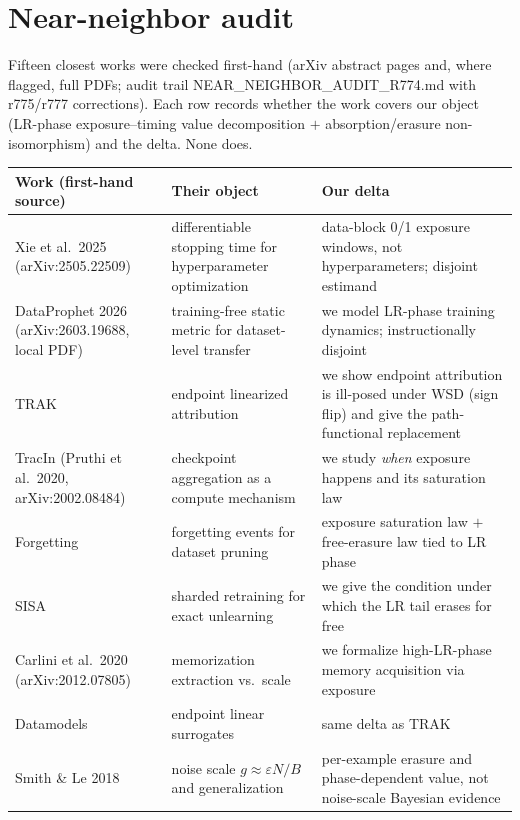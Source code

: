 \documentclass{article}
\begin{document}
\appendix
\section{Near-neighbor audit}
\label{app:neighbors}
Fifteen closest works were checked first-hand (arXiv abstract pages and, where flagged, full
PDFs; audit trail NEAR\_NEIGHBOR\_AUDIT\_R774.md with r775/r777 corrections). Each row records
whether the work covers our object (LR-phase exposure--timing value decomposition $+$
absorption/erasure non-isomorphism) and the delta. None does.

\begin{center}
\small
\begin{tabular}{@{}p{}p{}p{}@{}}
\toprule
Work (first-hand source) & Their object & Our delta \\
\midrule
Xie et al.\ 2025 (arXiv:2505.22509) & differentiable stopping time for hyperparameter
optimization & data-block 0/1 exposure windows, not hyperparameters; disjoint estimand \\
DataProphet 2026 (arXiv:2603.19688, local PDF) & training-free static metric for
dataset-level transfer & we model LR-phase training dynamics; instructionally disjoint \\
TRAK \citep{park2023trak} & endpoint linearized attribution & we show endpoint attribution is
ill-posed under WSD (sign flip) and give the path-functional replacement \\
TracIn (Pruthi et al.\ 2020, arXiv:2002.08484) & checkpoint aggregation as a compute
mechanism & we study \emph{when} exposure happens and its saturation law \\
Forgetting \citep{toneva2019forgetting} & forgetting events for dataset pruning & exposure
saturation law $+$ free-erasure law tied to LR phase \\
SISA \citep{bourtoule2021sisa} & sharded retraining for exact unlearning & we give the
condition under which the LR tail erases for free \\
Carlini et al.\ 2020 (arXiv:2012.07805) & memorization extraction vs.\ scale & we formalize
high-LR-phase memory acquisition via exposure \\
Datamodels \citep{ilyas2022datamodels} & endpoint linear surrogates & same delta as TRAK \\
Smith \& Le 2018 \citep{smith2017bayesian} & noise scale $g\approx\varepsilon N/B$ and
generalization & per-example erasure and phase-dependent value, not noise-scale Bayesian
evidence \\

\end{tabular}
\end{center}
\end{document}
